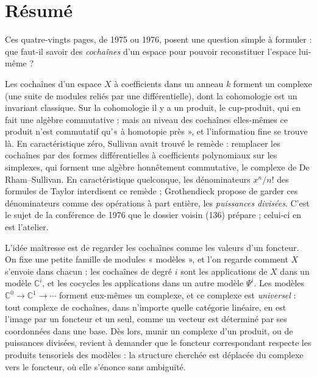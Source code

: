 \documentclass[11pt,a4paper]{article}
\begin{document}
\section*{Résumé}

\begin{resume}
Ces quatre-vingts pages, de 1975 ou 1976, posent une question simple à
formuler : que faut-il savoir des \emph{cochaînes} d'un espace pour pouvoir
reconstituer l'espace lui-même ?

Les cochaînes d'un espace $X$ à coefficients dans un anneau $k$ forment un
complexe (une suite de modules reliés par une différentielle), dont la
cohomologie est un invariant classique. Sur la cohomologie il y a un produit,
le cup-produit, qui en fait une algèbre commutative ; mais au niveau des
cochaînes elles-mêmes ce produit n'est commutatif qu'« à homotopie près », et
l'information fine se trouve là. En caractéristique zéro,
Sullivan avait trouvé le remède : remplacer les cochaînes par des formes
différentielles à coefficients polynomiaux sur les simplexes, qui forment une
algèbre honnêtement commutative, le complexe de De Rham–Sullivan. En
caractéristique quelconque, les dénominateurs $x^{n}/n!$ des formules de
Taylor interdisent ce remède ; Grothendieck propose de garder ces
dénominateurs comme des opérations à part entière, les \emph{puissances
divisées}. C'est le sujet de la conférence de 1976 que le dossier voisin
(136) prépare ; celui-ci en est l'atelier.

L'idée maîtresse est de regarder les cochaînes comme les valeurs d'un
foncteur. On fixe une petite famille de modules
« modèles », et l'on regarde comment $X$ s'envoie dans chacun : les cochaînes
de degré $i$ sont les applications de $X$ dans un modèle
$\mathbb{C}^{i}$, et les cocycles les applications dans un autre modèle
$\Psi^{i}$. Les modèles $\mathbb{C}^{0} \to \mathbb{C}^{1} \to \cdots$
forment eux-mêmes un complexe, et ce complexe est \emph{universel} : tout
complexe de cochaînes, dans n'importe quelle catégorie linéaire, en est
l'image par un foncteur et un seul, comme un vecteur est déterminé par ses
coordonnées dans une base. Dès lors, munir un complexe d'un produit, ou de
puissances divisées, revient à demander que le foncteur correspondant
respecte les produits tensoriels des modèles : la structure cherchée est
déplacée du complexe vers le foncteur, où elle s'énonce sans ambiguïté.


\end{resume}
\end{document}
